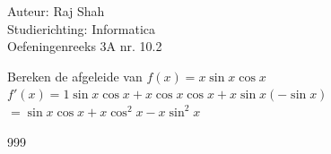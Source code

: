 \documentclass[a4paper]{article}
\begin{document}
  
\noindent \large Auteur: Raj Shah \\
\noindent \large Studierichting: Informatica\\
\noindent \large Oefeningenreeks 3A nr. 10.2\\

\medskip

\normalsize

Bereken de afgeleide van $f(x) = x\sin x \cos x$\\

$ f'(x) = 1\sin x \cos x + x\cos x \cos x + x \sin x (-\sin x)$\\

	$ = \sin x \cos x + x\cos^2 x - x\sin^2 x$\\

\begin{thebibliography}{999}
\end{thebibliography}
\end{document}
